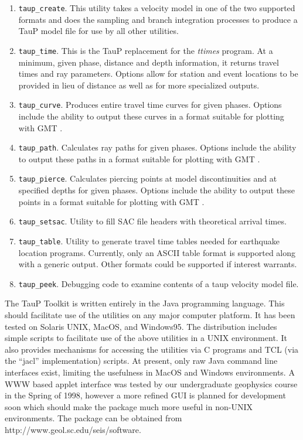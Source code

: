 \begin{enumerate}

\item
\texttt{taup\_create}.
This utility takes a velocity model in one of the two supported formats and does the
sampling and branch integration processes to produce a TauP model file for use by all
other utilities.

\item
\texttt{taup\_time}.
This is the TauP replacement for the \textit{ttimes} program.  At a minimum, given 
phase, distance and depth
information, it returns travel times and ray parameters.  Options allow for station and
event locations to be provided in lieu of distance as well as for more specialized
outputs.

\item
\texttt{taup\_curve}.
Produces entire travel time curves for given phases.  Options include the ability to
output these curves in a format suitable for plotting with GMT \cite{GMT}.

\item
\texttt{taup\_path}.
Calculates ray paths for given phases.  Options include the ability to output these paths 
in a format suitable for plotting with GMT \cite{GMT}.

\item
\texttt{taup\_pierce}.
Calculates piercing points at model discontinuities and at specified depths for given
phases.  Options include the ability to output these points 
in a format suitable for plotting with GMT \cite{GMT}.

\item
\texttt{taup\_setsac}.
Utility to fill SAC \cite{sacmanual} file headers with theoretical arrival times.

\item
\texttt{taup\_table}.
Utility to generate travel time tables needed for earthquake location programs.
Currently, only an ASCII table format is supported along with
a generic output.  
Other formats could be supported if interest warrants.

\item
\texttt{taup\_peek}.
Debugging code to examine contents of a taup velocity model file.

\end{enumerate}

The TauP Toolkit is written entirely in the Java programming language.
This should facilitate use of the utilities on any major computer platform.
It has been tested on Solaris UNIX, MacOS, and Windows95.
The distribution includes simple scripts to facilitate use of the above utilities 
in a UNIX environment.  
It also provides mechanisms for accessing the utilities via C programs and TCL
(via the ``jacl'' implementation) scripts.
At present, only raw Java command line interfaces exist, limiting the
usefulness in MacOS and Windows environments.
A WWW based applet interface was tested by our undergraduate geophysics course in the Spring of
1998, however a more refined GUI is planned for development soon which should make the
package much more useful in non-UNIX environments.
The package can be obtained from http://www.geol.sc.edu/seis/software.

